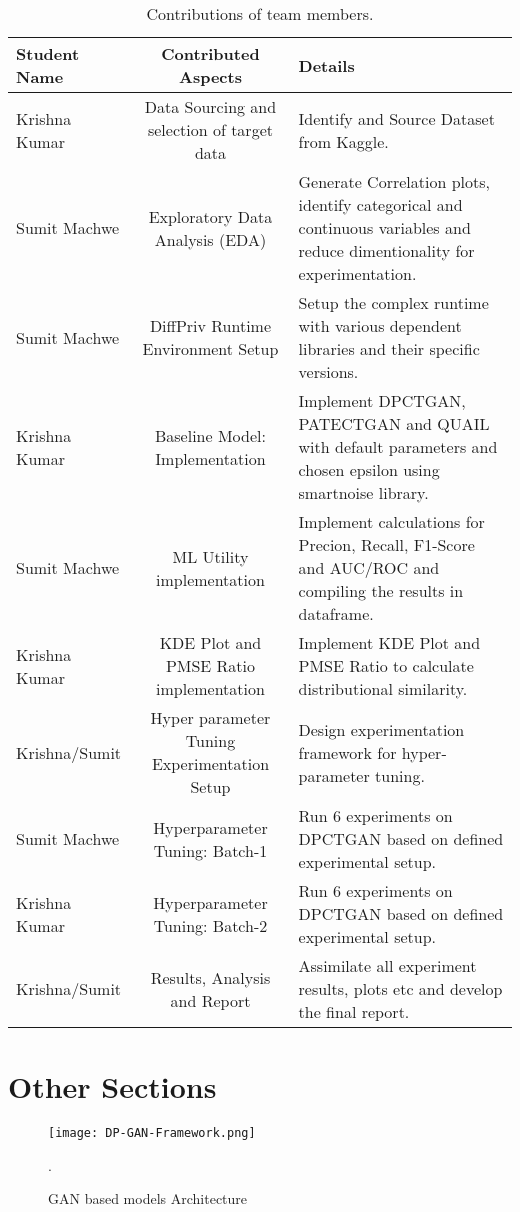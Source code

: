 \documentclass[10pt,twocolumn,letterpaper]{article}
\begin{document}
\begin{table*}
\begin{center}
\begin{tabular}{|l|c|p{8cm}|}
\hline
Student Name & Contributed Aspects & Details \\
\hline\hline
Krishna Kumar & Data Sourcing and selection of target data & Identify and Source Dataset from Kaggle. \\
Sumit Machwe & Exploratory Data Analysis (EDA) & Generate Correlation plots, identify categorical and continuous variables and reduce dimentionality for experimentation. \\
Sumit Machwe & DiffPriv Runtime Environment Setup & Setup the complex runtime with various dependent libraries and their specific versions. \\
Krishna Kumar & Baseline Model: Implementation & Implement DPCTGAN, PATECTGAN and QUAIL with default parameters and chosen epsilon using smartnoise library. \\
Sumit Machwe & ML Utility implementation & Implement calculations for Precion, Recall, F1-Score and AUC/ROC and compiling the results in dataframe. \\
Krishna Kumar & KDE Plot and PMSE Ratio implementation & Implement KDE Plot and PMSE Ratio to calculate distributional similarity. \\
Krishna/Sumit & Hyper parameter Tuning Experimentation Setup & Design experimentation framework for hyper-parameter tuning. \\
Sumit Machwe & Hyperparameter Tuning: Batch-1 & Run 6 experiments on DPCTGAN based on defined experimental setup. \\
Krishna Kumar & Hyperparameter Tuning: Batch-2 & Run 6 experiments on DPCTGAN based on defined experimental setup. \\
Krishna/Sumit & Results, Analysis and Report & Assimilate all experiment results, plots etc and develop the final report.\\

\hline
\end{tabular}
\end{center}
\caption{Contributions of team members.}
\label{tab:contributions}
\end{table*}


\section{Other Sections}

    \begin{figure}[ht]
    \begin{center}
       \texttt{[image: DP-GAN-Framework.png]}
    \end{center}
       \caption{GAN based models Architecture}.
    \label{fig:long}
    \label{fig:onecol}
    \end{figure}
\end{document}
